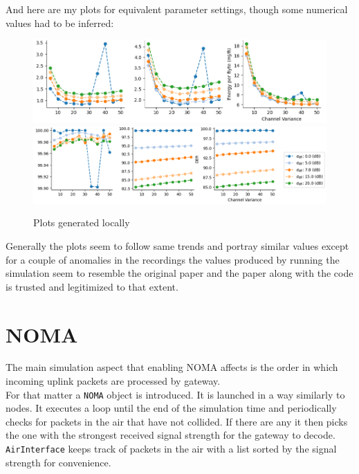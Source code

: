 And here are my plots for equivalent parameter settings, though
some numerical values had to be inferred:

\begin{figure}[H]
\centering
\includegraphics[scale=0.5]{figures/my_plots_1.PNG}\\
\hspace*{1.3cm}  
\includegraphics[scale=0.5]{figures/my_plots_2.PNG}
  \caption{Plots generated locally}
  \label{fig:my_sectors}
\end{figure}

Generally the plots seem to follow same trends and portray 
similar values except for a couple of anomalies in the
recordings the values produced by running the simulation
seem to resemble the original paper and the paper along with
the code is trusted and legitimized to that extent. 

\section{NOMA}
The main simulation aspect that enabling NOMA affects is the 
order in which incoming uplink packets are processed by 
gateway. \\

For that matter a \texttt{NOMA} object is introduced. It is 
launched in a way similarly to nodes. It executes a loop
until the end of the simulation time and periodically checks
for packets in the air that have not collided. If there are any
it then picks the one with the strongest received signal 
strength for the gateway to decode. \texttt{AirInterface} keeps
track of packets in the air with a list sorted by the signal
strength for convenience. 

